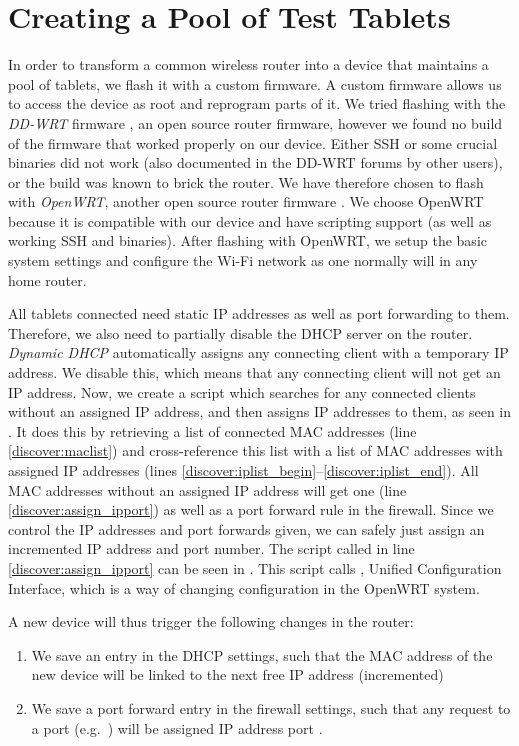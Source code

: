 \section{Creating a Pool of Test Tablets}
In order to transform a common wireless router into a device that maintains a pool of tablets, we flash it with a custom firmware. A custom firmware allows us to access the device as root and reprogram parts of it. We tried flashing with the \emph{DD-WRT} firmware , an open source router firmware, however we found no build of the firmware that worked properly on our device. Either SSH or some crucial binaries did not work (also documented in the DD-WRT forums by other users), or the build was known to brick the router. We have therefore chosen to flash with \emph{OpenWRT}, another open source router firmware . We choose OpenWRT because it is compatible with our device and have scripting support (as well as working SSH and binaries). After flashing with OpenWRT, we setup the basic system settings and configure the Wi-Fi network as one normally will in any home router.

All tablets connected need static IP addresses as well as port forwarding to them. Therefore, we also need to partially disable the DHCP server on the router. \emph{Dynamic DHCP} automatically assigns any connecting client with a temporary IP address. We disable this, which means that any connecting client will not get an IP address. Now, we create a script which searches for any connected clients without an assigned IP address, and then assigns IP addresses to them, as seen in . It does this by retrieving a list of connected MAC addresses (line \ref{discover:maclist}) and cross-reference this list with a list of MAC addresses with assigned IP addresses (lines \ref{discover:iplist_begin}--\ref{discover:iplist_end}). All MAC addresses without an assigned IP address will get one (line \ref{discover:assign_ipport}) as well as a port forward rule in the firewall. Since we control the IP addresses and port forwards given, we can safely just assign an incremented IP address and port number. The script called in line \ref{discover:assign_ipport} can be seen in . This script calls , Unified Configuration Interface, which is a way of changing configuration in the OpenWRT system. 

A new device will thus trigger the following changes in the router:
\begin{enumerate}
  \item We save an entry in the DHCP settings, such that the MAC address of the new device will be linked to the next free IP address (incremented)
  \item We save a port forward entry in the firewall settings, such that any request to a port (e.g.\ ) will be assigned IP address port .
\end{enumerate} 

